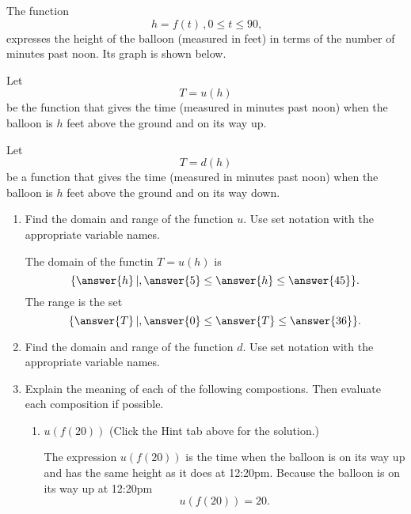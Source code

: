 \documentclass{ximera}
\begin{document}
\begin{exploration} \label{E4:Quadratics}
The function 
\[
\   h=f(t) \, , 0\leq t \leq 90, 
\]
expresses the height of the balloon (measured in feet) in terms of the number of minutes past noon. Its graph is shown below. 

 
\begin{onlineOnly}
    \begin{center}
\end{center}
\end{onlineOnly}


Let 
\[
    T = u(h)
\]
be the function that gives the time (measured in minutes past noon) when the balloon is $h$ feet above the ground and on its way up.

Let 
\[
    T = d(h)
\]
be a function that gives the time (measured in minutes past noon) when the balloon is $h$ feet above the ground and on its way down.

\begin{enumerate}

\item Find the domain and range of the function $u$. Use set notation with the appropriate variable names.

The domain of the functin $T=u(h)$ is
\[
    \{      \answer{h} \, | , \answer{5} \leq \answer{h} \leq \answer{45} \}.
\]
The range is the set
\[
   \{      \answer{T} \, | , \answer{0} \leq \answer{T} \leq \answer{36} \} .
\]

\item Find the domain and range of the function $d$. Use set notation with the appropriate variable names.

\item Explain the meaning of each of the following compostions. Then evaluate each composition if possible.

\begin{enumerate}
\item $u(f(20))$    (Click the Hint tab above for the solution.)

\begin{hint}
The expression $u(f(20))$ is the time when the balloon is on its way up and has the same height as it does at 12:20pm. Because the balloon is on its way up at 12:20pm
\[
   u(f(20)) = 20.
\]
\end{hint}


\end{enumerate}
\end{enumerate}
\end{exploration}
\end{document}
